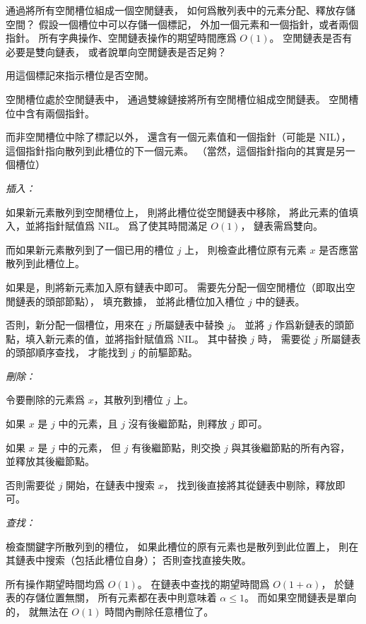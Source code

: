 \startEXERCISE
通過將所有空閒槽位組成一個空閒鏈表，
如何爲散列表中的元素分配、釋放存儲空間？
假設一個槽位中可以存儲一個標記，
外加一個元素和一個指針，或者兩個指針。
所有字典操作、空閒鏈表操作的期望時間應爲 $O(1)$。
空閒鏈表是否有必要是雙向鏈表，
或者說單向空閒鏈表是否足夠？
\stopEXERCISE

\startANSWER
用這個標記來指示槽位是否空閒。

空閒槽位處於空閒鏈表中，
通過雙線鏈接將所有空閒槽位組成空閒鏈表。
空閒槽位中含有兩個指針。

而非空閒槽位中除了標記以外，
還含有一個元素值和一個指針（可能是 NIL），
這個指針指向散列到此槽位的下一個元素。
（當然，這個指針指向的其實是另一個槽位）

\emph{插入：}

如果新元素散列到空閒槽位上，
則將此槽位從空閒鏈表中移除，
將此元素的值填入，並將指針賦值爲 NIL。
爲了使其時間滿足 $O(1)$，
鏈表需爲雙向。

而如果新元素散列到了一個已用的槽位 $j$ 上，
則檢查此槽位原有元素 $x$ 是否應當散列到此槽位上。

如果是，則將新元素加入原有鏈表中即可。
需要先分配一個空閒槽位（即取出空閒鏈表的頭部節點），
填充數據，
並將此槽位加入槽位 $j$ 中的鏈表。

否則，新分配一個槽位，用來在 $j$ 所屬鏈表中替換 $j$。
並將 $j$ 作爲新鏈表的頭節點，填入新元素的值，並將指針賦值爲 NIL。
其中替換 $j$ 時，
需要從 $j$ 所屬鏈表的頭部順序查找，
才能找到 $j$ 的前驅節點。

\emph{刪除：}

令要刪除的元素爲 $x$，其散列到槽位 $j$ 上。

如果 $x$ 是 $j$ 中的元素，且 $j$ 沒有後繼節點，則釋放 $j$ 即可。

如果 $x$ 是 $j$ 中的元素，
但 $j$ 有後繼節點，則交換 $j$ 與其後繼節點的所有內容，
並釋放其後繼節點。

否則需要從 $j$ 開始，在鏈表中搜索 $x$，
找到後直接將其從鏈表中剔除，釋放即可。

\emph{查找：}

檢查關鍵字所散列到的槽位，
如果此槽位的原有元素也是散列到此位置上，
則在其鏈表中搜索（包括此槽位自身）；
否則查找直接失敗。

所有操作期望時間均爲 $O(1)$。
在鏈表中查找的期望時間爲 $O(1+\alpha)$，
於鏈表的存儲位置無關，
所有元素都在表中則意味着 $\alpha\le 1$。
而如果空閒鏈表是單向的，
就無法在 $O(1)$ 時間內刪除任意槽位了。
\stopANSWER

